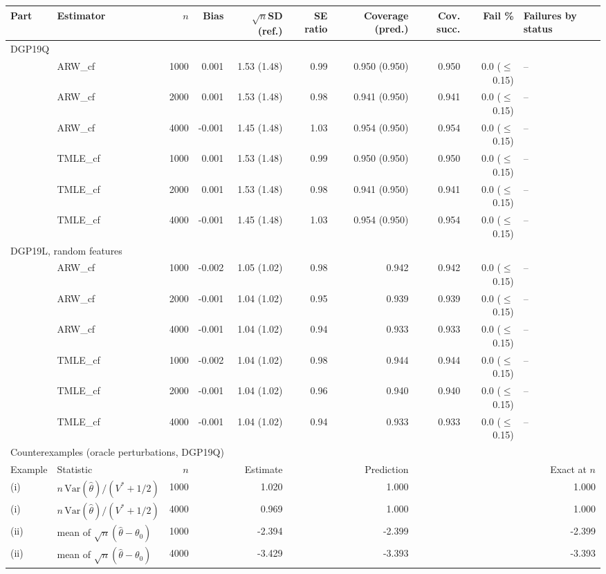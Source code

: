 \begin{tabular}{llrrrrrrrl}
\hline
Part & Estimator & $n$ & Bias & $\sqrt{n}$SD (ref.) & SE ratio & Coverage (pred.) & Cov. succ. & Fail \% & Failures by status \\
\hline
\multicolumn{10}{l}{DGP19Q} \\
 & ARW\_cf & 1000 & 0.001 & 1.53 (1.48) & 0.99 & 0.950 (0.950) & 0.950 & 0.0 ($\le$0.15) & -- \\
 & ARW\_cf & 2000 & 0.001 & 1.53 (1.48) & 0.98 & 0.941 (0.950) & 0.941 & 0.0 ($\le$0.15) & -- \\
 & ARW\_cf & 4000 & -0.001 & 1.45 (1.48) & 1.03 & 0.954 (0.950) & 0.954 & 0.0 ($\le$0.15) & -- \\
 & TMLE\_cf & 1000 & 0.001 & 1.53 (1.48) & 0.99 & 0.950 (0.950) & 0.950 & 0.0 ($\le$0.15) & -- \\
 & TMLE\_cf & 2000 & 0.001 & 1.53 (1.48) & 0.98 & 0.941 (0.950) & 0.941 & 0.0 ($\le$0.15) & -- \\
 & TMLE\_cf & 4000 & -0.001 & 1.45 (1.48) & 1.03 & 0.954 (0.950) & 0.954 & 0.0 ($\le$0.15) & -- \\
\multicolumn{10}{l}{DGP19L, random features} \\
 & ARW\_cf & 1000 & -0.002 & 1.05 (1.02) & 0.98 & 0.942 & 0.942 & 0.0 ($\le$0.15) & -- \\
 & ARW\_cf & 2000 & -0.001 & 1.04 (1.02) & 0.95 & 0.939 & 0.939 & 0.0 ($\le$0.15) & -- \\
 & ARW\_cf & 4000 & -0.001 & 1.04 (1.02) & 0.94 & 0.933 & 0.933 & 0.0 ($\le$0.15) & -- \\
 & TMLE\_cf & 1000 & -0.002 & 1.04 (1.02) & 0.98 & 0.944 & 0.944 & 0.0 ($\le$0.15) & -- \\
 & TMLE\_cf & 2000 & -0.001 & 1.04 (1.02) & 0.96 & 0.940 & 0.940 & 0.0 ($\le$0.15) & -- \\
 & TMLE\_cf & 4000 & -0.001 & 1.04 (1.02) & 0.94 & 0.933 & 0.933 & 0.0 ($\le$0.15) & -- \\
\hline
\multicolumn{10}{l}{Counterexamples (oracle perturbations, DGP19Q)} \\
Example & Statistic & $n$ & \multicolumn{2}{r}{Estimate} & \multicolumn{2}{r}{Prediction} & \multicolumn{3}{r}{Exact at $n$} \\
\hline
(i) & $n\,\mathrm{Var}(\widehat\theta)/(V^*+1/2)$ & 1000 & \multicolumn{2}{r}{1.020} & \multicolumn{2}{r}{1.000} & \multicolumn{3}{r}{1.000} \\
(i) & $n\,\mathrm{Var}(\widehat\theta)/(V^*+1/2)$ & 4000 & \multicolumn{2}{r}{0.969} & \multicolumn{2}{r}{1.000} & \multicolumn{3}{r}{1.000} \\
(ii) & mean of $\sqrt{n}(\widehat\theta-\theta_0)$ & 1000 & \multicolumn{2}{r}{-2.394} & \multicolumn{2}{r}{-2.399} & \multicolumn{3}{r}{-2.399} \\
(ii) & mean of $\sqrt{n}(\widehat\theta-\theta_0)$ & 4000 & \multicolumn{2}{r}{-3.429} & \multicolumn{2}{r}{-3.393} & \multicolumn{3}{r}{-3.393} \\
\hline
\end{tabular}
